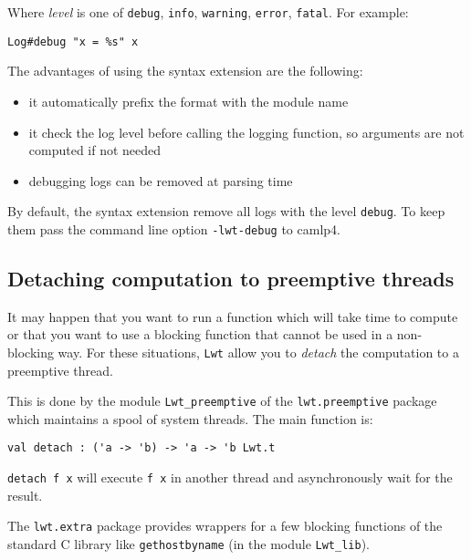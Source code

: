 \documentclass{article}
\newcommand{\lwt}{\texttt{Lwt}\xspace}
\begin{document}
Where \textit{level} is one of \texttt{debug}, \texttt{info},
\texttt{warning}, \texttt{error}, \texttt{fatal}. For example:

\begin{verbatim}
Log#debug "x = %s" x
\end{verbatim}

The advantages of using the syntax extension are the following:

\begin{itemize}
\item it automatically prefix the format with the module name
\item it check the log level before calling the logging function, so
  arguments are not computed if not needed
\item debugging logs can be removed at parsing time
\end{itemize}

By default, the syntax extension remove all logs with the level
\texttt{debug}. To keep them pass the command line option
\texttt{-lwt-debug} to camlp4.

\subsection{Detaching computation to preemptive threads}

It may happen that you want to run a function which will take time to
compute or that you want to use a blocking function that cannot be
used in a non-blocking way. For these situations, \lwt allow you to
\emph{detach} the computation to a preemptive thread.

This is done by the module \texttt{Lwt\_preemptive} of the
\texttt{lwt.preemptive} package which maintains a spool of system
threads. The main function is:

\begin{verbatim}
val detach : ('a -> 'b) -> 'a -> 'b Lwt.t
\end{verbatim}

\texttt{detach f x} will execute \texttt{f x} in another thread and
asynchronously wait for the result.

The \texttt{lwt.extra} package provides wrappers for a few blocking
functions of the standard C library like \texttt{gethostbyname} (in
the module \texttt{Lwt\_lib}).

\end{document}
